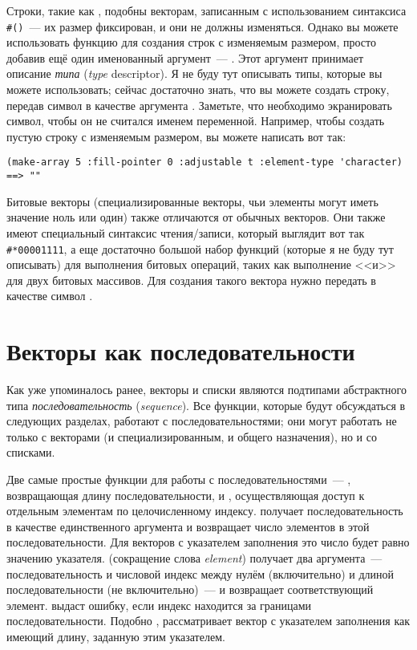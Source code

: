 Строки, такие как , подобны векторам, записанным с использованием синтаксиса
\lstinline!#()!~--- их размер фиксирован, и они не должны изменяться.  Однако вы можете
использовать функцию  для создания строк с изменяемым размером, просто
добавив ещё один именованный аргумент~--- .  Этот аргумент принимает
описание \textit{типа} (\textit{type} descriptor).  Я не буду тут описывать типы, которые
вы можете использовать; сейчас достаточно знать, что вы можете создать строку, передав символ
 в качестве аргумента .  Заметьте, что необходимо экранировать
символ, чтобы он не считался именем переменной.  Например, чтобы создать пустую строку с
изменяемым размером, вы можете написать вот так:

\begin{lstlisting}[style=lisprepl]
  (make-array 5 :fill-pointer 0 :adjustable t :element-type 'character) ==> ""
\end{lstlisting}

Битовые векторы (специализированные векторы, чьи элементы могут иметь значение ноль или
один) также отличаются от обычных векторов.  Они также имеют специальный синтаксис
чтения/записи, который выглядит вот так \lstinline!#*00001111!, а еще достаточно большой
набор функций (которые я не буду тут описывать) для выполнения битовых операций, таких как
выполнение <<и>> для двух битовых массивов.  Для создания такого вектора нужно передать
в качестве  символ .

\section{Векторы как последовательности}

Как уже упоминалось ранее, векторы и списки являются подтипами абстрактного типа
\textit{последовательность} (\textit{sequence}).  Все функции, которые будут обсуждаться
в следующих разделах, работают с последовательностями; они могут работать не только с векторами
(и специализированным, и общего назначения), но и со списками.

Две самые простые функции для работы с последовательностями~--- ,
возвращающая длину последовательности, и , осуществляющая доступ к
отдельным элементам по целочисленному индексу.   получает
последовательность в качестве единственного аргумента и возвращает число элементов в этой
последовательности.  Для векторов с указателем заполнения это число будет равно значению
указателя.  (сокращение слова \textit{element}) получает два аргумента~---
последовательность и числовой индекс между нулём (включительно) и длиной
последовательности (не включительно)~--- и возвращает соответствующий элемент.   выдаст ошибку,
если индекс находится за границами последовательности.  Подобно , 
рассматривает вектор с указателем заполнения как имеющий длину, заданную этим
указателем.

